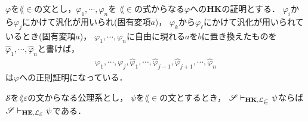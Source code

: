 \begin{metaprf}
		$\varphi$を$\lang{\in}$の文とし，$\varphi_{1},\cdots,\varphi_{n}$を
		$\lang{\in}$の式からなる$\varphi$への{\bf HK}の証明とする．
		$\varphi_{i}$から$\varphi_{j}$にかけて汎化が用いられ(固有変項$a$)，
		$\varphi_{k}$から$\varphi_{\ell}$にかけて汎化が用いられているとき(固有変項$a$)，
		$\varphi_{1},\cdots,\varphi_{n}$に自由に現れる$a$を$b$に置き換えたものを
		$\hat{\varphi}_{1},\cdots,\hat{\varphi}_{n}$と書けば，
		\begin{align}
			\varphi_{1},\cdots,\varphi_{j},
			\hat{\varphi}_{1},\cdots,\hat{\varphi}_{j-1},\hat{\varphi}_{j+1},
			\cdots,\hat{\varphi}_{n}
		\end{align}
		は$\varphi$への正則証明になっている．
		\QED
	\end{metaprf}
	
	\begin{screen}
		\begin{metathm}
		\label{metathm:theorems_in_HK_provable_in_HE}
			$\mathscr{S}$を$\lang{\varepsilon}$の文からなる公理系とし，
			$\psi$を$\lang{\in}$の文とするとき，
			$\mathscr{S} \provable{\mbox{{\bf HK}},\lang{\in}} \psi$ならば
			$\mathscr{S} \provable{\mbox{{\bf HE}},\lang{\varepsilon}} \psi$である．
		\end{metathm}
	\end{screen}
	

